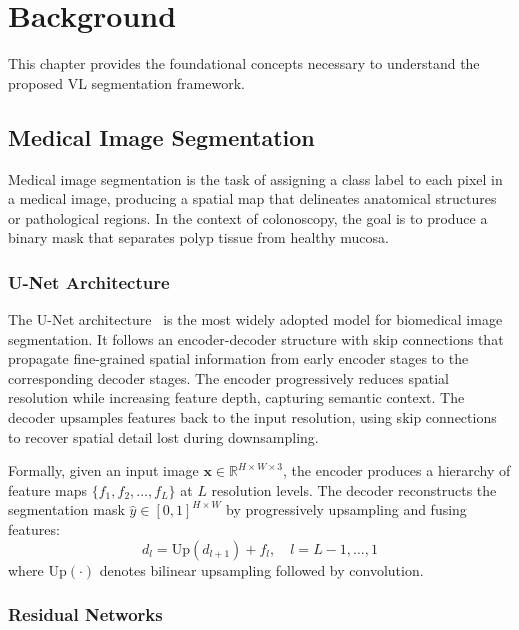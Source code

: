 
\chapter{Background}
\label{ch:background}

This chapter provides the foundational concepts necessary to understand the proposed \ac{VL} segmentation framework.

\section{Medical Image Segmentation}
\label{sec:bg:medseg}

Medical image segmentation is the task of assigning a class label to each pixel in a medical image, producing a spatial map that delineates anatomical structures or pathological regions. In the context of colonoscopy, the goal is to produce a binary mask that separates polyp tissue from healthy mucosa.

\subsection{U-Net Architecture}
\label{sec:bg:unet}

The U-Net architecture~\cite{ronneberger2015unet} is the most widely adopted model for biomedical image segmentation. It follows an encoder-decoder structure with skip connections that propagate fine-grained spatial information from early encoder stages to the corresponding decoder stages. The encoder progressively reduces spatial resolution while increasing feature depth, capturing semantic context. The decoder upsamples features back to the input resolution, using skip connections to recover spatial detail lost during downsampling.

Formally, given an input image $\mathbf{x} \in \mathbb{R}^{H \times W \times 3}$, the encoder produces a hierarchy of feature maps $\{f_1, f_2, \ldots, f_L\}$ at $L$ resolution levels. The decoder reconstructs the segmentation mask $\hat{y} \in [0,1]^{H \times W}$ by progressively upsampling and fusing features:
\begin{equation}
	d_l = \text{Up}(d_{l+1}) + f_l, \quad l = L-1, \ldots, 1
\end{equation}
where $\text{Up}(\cdot)$ denotes bilinear upsampling followed by convolution.

\subsection{Residual Networks}
\label{sec:bg:resnet}

